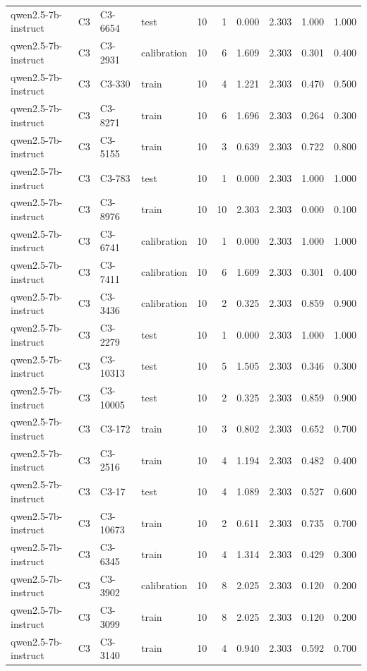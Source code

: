 \begin{table}
\begin{tabular}{llllrrrrrr}
qwen2.5-7b-instruct & C3 & C3-6654 & test & 10 & 1 & 0.000 & 2.303 & 1.000 & 1.000 \\
qwen2.5-7b-instruct & C3 & C3-2931 & calibration & 10 & 6 & 1.609 & 2.303 & 0.301 & 0.400 \\
qwen2.5-7b-instruct & C3 & C3-330 & train & 10 & 4 & 1.221 & 2.303 & 0.470 & 0.500 \\
qwen2.5-7b-instruct & C3 & C3-8271 & train & 10 & 6 & 1.696 & 2.303 & 0.264 & 0.300 \\
qwen2.5-7b-instruct & C3 & C3-5155 & train & 10 & 3 & 0.639 & 2.303 & 0.722 & 0.800 \\
qwen2.5-7b-instruct & C3 & C3-783 & test & 10 & 1 & 0.000 & 2.303 & 1.000 & 1.000 \\
qwen2.5-7b-instruct & C3 & C3-8976 & train & 10 & 10 & 2.303 & 2.303 & 0.000 & 0.100 \\
qwen2.5-7b-instruct & C3 & C3-6741 & calibration & 10 & 1 & 0.000 & 2.303 & 1.000 & 1.000 \\
qwen2.5-7b-instruct & C3 & C3-7411 & calibration & 10 & 6 & 1.609 & 2.303 & 0.301 & 0.400 \\
qwen2.5-7b-instruct & C3 & C3-3436 & calibration & 10 & 2 & 0.325 & 2.303 & 0.859 & 0.900 \\
qwen2.5-7b-instruct & C3 & C3-2279 & test & 10 & 1 & 0.000 & 2.303 & 1.000 & 1.000 \\
qwen2.5-7b-instruct & C3 & C3-10313 & test & 10 & 5 & 1.505 & 2.303 & 0.346 & 0.300 \\
qwen2.5-7b-instruct & C3 & C3-10005 & test & 10 & 2 & 0.325 & 2.303 & 0.859 & 0.900 \\
qwen2.5-7b-instruct & C3 & C3-172 & train & 10 & 3 & 0.802 & 2.303 & 0.652 & 0.700 \\
qwen2.5-7b-instruct & C3 & C3-2516 & train & 10 & 4 & 1.194 & 2.303 & 0.482 & 0.400 \\
qwen2.5-7b-instruct & C3 & C3-17 & test & 10 & 4 & 1.089 & 2.303 & 0.527 & 0.600 \\
qwen2.5-7b-instruct & C3 & C3-10673 & train & 10 & 2 & 0.611 & 2.303 & 0.735 & 0.700 \\
qwen2.5-7b-instruct & C3 & C3-6345 & train & 10 & 4 & 1.314 & 2.303 & 0.429 & 0.300 \\
qwen2.5-7b-instruct & C3 & C3-3902 & calibration & 10 & 8 & 2.025 & 2.303 & 0.120 & 0.200 \\
qwen2.5-7b-instruct & C3 & C3-3099 & train & 10 & 8 & 2.025 & 2.303 & 0.120 & 0.200 \\
qwen2.5-7b-instruct & C3 & C3-3140 & train & 10 & 4 & 0.940 & 2.303 & 0.592 & 0.700 \\

\end{tabular}
\end{table}
